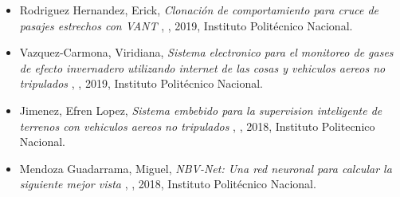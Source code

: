 \begin{itemize} 
\item Rodriguez Hernandez, Erick, \textit{ Clonación de comportamiento para cruce de pasajes estrechos con VANT }, \href{ https://jivasquez.files.wordpress.com/2019/08/tesiserhempastar.pdf }{\faFilePdfO}, 2019, Instituto Politécnico Nacional. 
\item Vazquez-Carmona, Viridiana, \textit{ Sistema electronico para el monitoreo de gases de efecto invernadero utilizando internet de las cosas y vehiculos aereos no tripulados }, \href{ https://jivasquez.files.wordpress.com/2020/09/2019_maestria_vazquez.pdf }{\faFilePdfO}, 2019, Instituto Polit\'ecnico Nacional. 
\item Jimenez, Efren Lopez, \textit{ Sistema embebido para la supervision inteligente de terrenos con vehiculos aereos no tripulados }, \href{ https://jivasquez.files.wordpress.com/2018/12/master_thesis_2018_lopez.pdf }{\faFilePdfO}, 2018, Instituto Politecnico Nacional. 
\item Mendoza Guadarrama, Miguel, \textit{ NBV-Net: Una red neuronal para calcular la siguiente mejor vista }, \href{ https://jivasquez.files.wordpress.com/2018/12/2018_maestria_Mendoza.pdf }{\faFilePdfO}, 2018, Instituto Politécnico Nacional. 
\end{itemize} 
